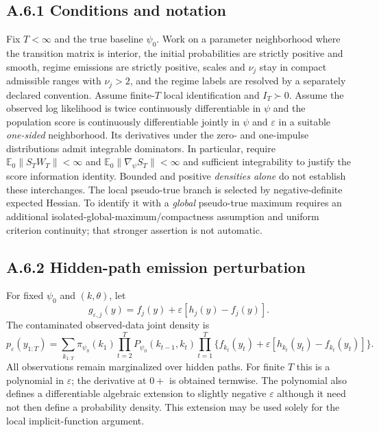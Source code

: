 \documentclass[11pt,a4paper]{article}
\newcommand{\E}{\mathbb E}
\newcommand{\eps}{\varepsilon}
\begin{document}
\subsection*{A.6.1 Conditions and notation}
Fix $T<\infty$ and the true baseline $\psi_0$. Work on a parameter neighborhood where the transition matrix is interior, the initial probabilities are strictly positive and smooth, regime emissions are strictly positive, scales and $\nu_j$ stay in compact admissible ranges with $\nu_j>2$, and the regime labels are resolved by a separately declared convention. Assume finite-$T$ local identification and $I_T\succ0$. Assume the observed log likelihood is twice continuously differentiable in $\psi$ and the population score is continuously differentiable jointly in $\psi$ and $\eps$ in a suitable \emph{one-sided} neighborhood. Its derivatives under the zero- and one-impulse distributions admit integrable dominators. In particular, require $\E_0\|S_TW_T\|<\infty$ and $\E_0\|\nabla_\psi S_T\|<\infty$ and sufficient integrability to justify the score information identity. Bounded and positive \emph{densities alone} do not establish these interchanges. The local pseudo-true branch is selected by negative-definite expected Hessian. To identify it with a \emph{global} pseudo-true maximum requires an additional isolated-global-maximum/compactness assumption and uniform criterion continuity; that stronger assertion is not automatic.

\subsection*{A.6.2 Hidden-path emission perturbation}
For fixed $\psi_0$ and $(k,\theta)$, let
\begin{equation}
g_{\eps,j}(y)=f_j(y)+\eps[h_j(y)-f_j(y)].\label{eq:app1}
\end{equation}
The contaminated observed-data joint density is
\begin{equation}
p_\eps(y_{1:T})=\sum_{k_{1:T}}\pi_{\psi_0}(k_1)\prod_{t=2}^TP_{\psi_0}(k_{t-1},k_t)
\prod_{t=1}^T\big\{f_{k_t}(y_t)+\eps[h_{k_t}(y_t)-f_{k_t}(y_t)]\big\}.\label{eq:app2}
\end{equation}
All observations remain marginalized over hidden paths. For finite $T$ this is a polynomial in $\eps$; the derivative at $0+$ is obtained termwise. The polynomial also defines a differentiable algebraic extension to slightly negative $\eps$ although it need not then define a probability density. This extension may be used solely for the local implicit-function argument.
\end{document}
